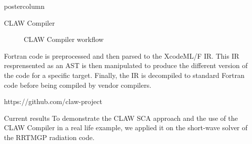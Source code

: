 \documentclass{beamer}
\begin{document}
\begin{frame}
\begin{columns}
\begin{column}{.57\textwidth}
\begin{beamercolorbox}[center]{postercolumn}
\begin{minipage}{.98\textwidth}
{\begin{myblock}{CLAW Compiler}
\begin{figure}
  \caption[CLAW Compiler workflow]{CLAW Compiler workflow}
  \label{fig:clawfc}
\end{figure}

Fortran code is preprocessed and then parsed to the XcodeML/F IR. This IR
resprensented as an AST is then manipulated
to produce the different version of the code for a specific target. Finally, the
IR is decompiled to standard Fortran code before being compiled by vendor
compilers.

 https://github.com/claw-project

\end{myblock}\vfill

%
%
\begin{myblock}{Current results}
To demonstrate the CLAW SCA approach and the use of the CLAW Compiler in a real
life example, we applied it on the short-wave solver of the RRTMGP radiation
code.


\end{myblock}}
\end{minipage}
\end{beamercolorbox}
\end{column}
\end{columns}
\end{frame}
\end{document}
